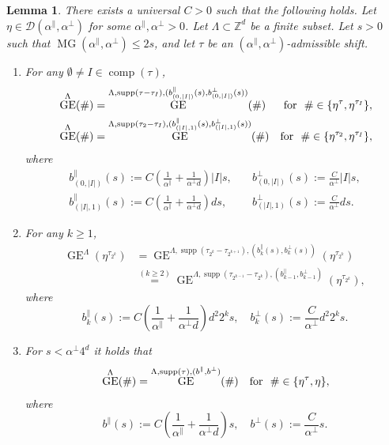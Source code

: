 \documentclass[11pt, reqno]{amsart}
\newtheorem{lemma}[theorem]{Lemma}
\newcommand{\Z}{\mathbb{Z}}
\DeclareMathOperator{\supp}{supp}
\DeclareMathOperator{\GE}{GE}
\DeclareMathOperator{\MG}{MG}
\DeclareMathOperator{\comp}{comp}
\numberwithin{equation}{section}
\begin{document}
\begin{lemma}\label{lem:layering bounds for given maximal gain}
There exists a universal $C>0$ such that the following holds. 
Let $\eta\in\mathcal{D}(\alpha^{\parallel},\alpha^{\perp})$ for some  $\alpha^{\parallel},\alpha^{\perp}>0$.
Let $\Lambda \subset \Z^d$ be a finite subset.
Let $s>0$ such that $\MG(\alpha^{\parallel},\alpha^{\perp})\leq 2s$, and let $\tau$ be an $(\alpha^{\parallel},\alpha^{\perp})$-admissible shift. 
\begin{enumerate}
\item 
For any $\emptyset\neq I\in\comp(\tau)$,
\begin{align*}
&\GE^{\Lambda}(\#)=
\GE^{\Lambda,\supp(\tau-\tau_{I}),(b_{(0,|I|)}^{\parallel}(s),b_{(0,|I|)}^{\perp}(s))}(\#)       & \text{\emph{for } }\#\in \{\eta^{\tau},\eta^{\tau_{I}} \}, \\
&\GE^{\Lambda}(\#)=
\GE^{\Lambda,\supp(\tau_{2}-\tau_I),(b_{(|I|,1)}^{\parallel}(s),b_{(|I|,1)}^{\perp}(s))}(\#) & \text{\emph{for } }\#\in \{\eta^{\tau_2}, \eta^{\tau_{I}} \},
\end{align*}
where 
\begin{align*}
b_{(0,|I|)}^{\parallel}(s):=C \left( \frac{1}{{\alpha}^{\parallel}}+\frac{1}{{\alpha}^{\perp}d}  \right) |I|s, &\quad
b_{(0,|I|)}^{\perp}(s):=\frac{C}{{\alpha}^{\perp}}|I| s,  \\
b_{(|I|,1)}^{\parallel}(s):=
C\left( \frac{1}{{\alpha}^{\parallel}}+ \frac{1}{{\alpha}^{\perp}d}  \right) d s,
&\quad
b_{(|I|,1)}^{\perp}(s):= \frac{C}{{\alpha}^{\perp}} d s .
\end{align*}
\item  
For any $k\geq 1$,
\begin{align*}
\GE^{\Lambda}(\eta^{\tau_{2^{k}}})&=
\GE^{\Lambda,\supp(\tau_{2^{k}}-\tau_{2^{k+1}}),(b_k^{\parallel}(s),b_k^{\perp}(s))}(\eta^{\tau_{2^{k}}})\\&\stackrel{(k\geq 2)}{=}\GE^{\Lambda,\supp(\tau_{2^{k-1}}-\tau_{2^{k}}),(b_{k-1}^{\parallel},b_{k-1}^{\perp})}(\eta^{\tau_{2^{k}}}),
\end{align*}
where 
\begin{equation*}
b_{k}^{\parallel}(s):= C \left( \frac{1}{{\alpha}^{\parallel}} +\frac{1 }{
 {\alpha}^{\perp}d}\right) d^2 2^{k} s,\quad
b_{k}^{\perp}(s):=\frac{C}{{\alpha}^{\perp}} d^{2} 2^{k} s.
\end{equation*}
\item 
For $s<{\alpha}^{\perp} 4^d$ it holds that
\begin{align*}
& \GE^{\Lambda}(\#) =
\GE^{\Lambda,\supp(\tau),(b^{\parallel} ,b^{\perp}) }(\#)  & \text{\emph{for } }\#\in \{\eta^{\tau}, \eta \},     
\end{align*}
where
\begin{equation*}
 b^{\parallel}(s):=C \left(\frac{1} {{\alpha}^{\parallel}} +\frac{1}{{\alpha}^{\perp}d} \right)  s, \quad
b^{\perp}(s):= \frac{C}{{\alpha}^{\perp}}  s.
\end{equation*}       
 \end{enumerate}
\end{lemma}
            
\end{document}
